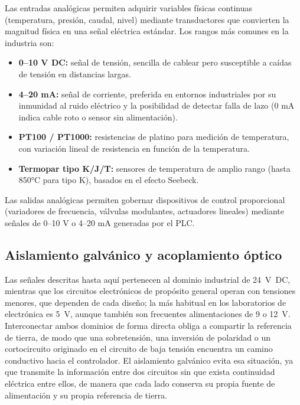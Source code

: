 \documentclass[12pt,a4paper,oneside]{report}
\begin{document}
Las entradas analógicas permiten adquirir variables físicas continuas (temperatura, presión, caudal, nivel) mediante transductores que convierten la magnitud física en una señal eléctrica estándar. Los rangos más comunes en la industria son:

\begin{itemize}
    \item \textbf{0--10 V DC:} señal de tensión, sencilla de cablear pero susceptible a caídas de tensión en distancias largas.
    \item \textbf{4--20 mA:} señal de corriente, preferida en entornos industriales por su inmunidad al ruido eléctrico y la posibilidad de detectar falla de lazo (0 mA indica cable roto o sensor sin alimentación).
    \item \textbf{PT100 / PT1000:} resistencias de platino para medición de temperatura, con variación lineal de resistencia en función de la temperatura.
    \item \textbf{Termopar tipo K/J/T:} sensores de temperatura de amplio rango (hasta 850°C para tipo K), basados en el efecto Seebeck.
\end{itemize}

Las salidas analógicas permiten gobernar dispositivos de control proporcional (variadores de frecuencia, válvulas modulantes, actuadores lineales) mediante señales de 0--10 V o 4--20 mA generadas por el PLC.

\subsection{Aislamiento galvánico y acoplamiento óptico}
\label{subsec:optoacoplador}

Las señales descritas hasta aquí pertenecen al dominio industrial de 24~V~DC, mientras que los circuitos electrónicos de propósito general operan con tensiones menores, que dependen de cada diseño; la más habitual en los laboratorios de electrónica es 5~V, aunque también son frecuentes alimentaciones de 9 o 12~V. Interconectar ambos dominios de forma directa obliga a compartir la referencia de tierra, de modo que una sobretensión, una inversión de polaridad o un cortocircuito originado en el circuito de baja tensión encuentra un camino conductivo hacia el controlador. El aislamiento galvánico evita esa situación, ya que transmite la información entre dos circuitos sin que exista continuidad eléctrica entre ellos, de manera que cada lado conserva su propia fuente de alimentación y su propia referencia de tierra.
\end{document}
